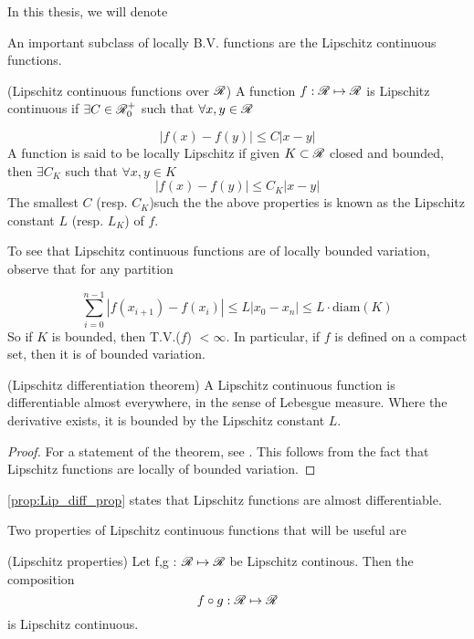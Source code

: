 \begin{definition}
In this thesis, we will denote 

An important subclass of locally B.V. functions are the Lipschitz continuous functions. 

\begin{definition}(Lipschitz continuous functions over $\mathscr{R}$)
	A function $f : \mathscr{R} \mapsto \mathscr{R}$ is Lipschitz continuous if $ \exists C \in \mathscr{R}^+_0$ such that $\forall x,y \in \mathscr{R}$
	
	\begin{equation} \label{def:Lipschitz_R}
		\left|f(x) - f(y)\right| \leq C\left|x - y\right|
	\end{equation} 
	A function is said to be locally Lipschitz if given $K \subset \mathscr{R}$ closed and bounded, then $\exists C_K$ such that $\forall x,y \in K$
	\begin{equation} \label{def:Lipschitz_K}
		\left|f(x) - f(y)\right| \leq C_K\left|x - y\right|
	\end{equation} 
	The smallest $C$ (resp. $C_K$)such the the above properties is known as the Lipschitz constant $L$ (resp. $L_K$) of $f$. 
\end{definition} 

To see that Lipschitz continuous functions are of locally bounded variation, observe that for any partition 

\begin{equation}
	\sum_{i = 0}^{n-1} \left| f(x_{i+1}) - f(x_i)\right| \leq L\left| x_0 - x_n \right| \leq L \cdot \text{diam}(K)
\end{equation}
So if $K$ is bounded, then T.V.($f$) $< \infty$. In particular, if $f$ is defined on a compact set, then it is of bounded variation. 

\begin{proposition}(Lipschitz differentiation theorem) \label{prop:Lip_diff_prop}
	A Lipschitz continuous function is differentiable almost everywhere, in the sense of Lebesgue measure. Where the derivative exists, it is bounded by the Lipschitz constant $L$. 
\end{proposition}
\begin{proof}
	For a statement of the theorem, see \cite[p.167]{tao2011introduction}. This follows from the fact that Lipschitz functions are locally of bounded variation. 
\end{proof}

\eqref{prop:Lip_diff_prop} states that Lipschitz functions are almost differentiable. 

Two properties of Lipschitz continuous functions that will be useful are 
\begin{proposition}(Lipschitz properties) \label{prop: Lipschitz_props}
	Let f,g : $\mathscr{R} \mapsto \mathscr{R}$ be Lipschitz continous. Then the composition
	\begin{equation}
		f \circ g : \mathscr{R} \mapsto \mathscr{R}
	\end{equation}
	is Lipschitz continuous. 
	

\end{proposition}
\end{definition}
